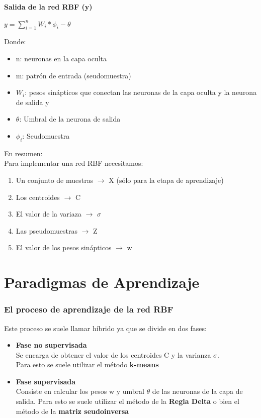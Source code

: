 \documentclass[
	11pt, %
]{beamer}
\begin{document}
\begin{frame}

  \textbf{Salida de la red RBF (y)}
  \bigskip %
  \begin{center}
    $y = \sum_{i=1} ^{n} W_{i} * \phi_{i} - \theta $
  \end{center}
  \bigskip %
  Donde:
  \begin{itemize}
  \item n: neuronas en la capa oculta
  \item m: patrón de entrada (seudomuestra)
  \item $W_{i}$: pesos sinápticos que conectan las neuronas de la capa oculta y la neurona de salida y
  \item $\theta$: Umbral de la neurona de salida
  \item $\phi_{i}$: Seudomuestra
  \end{itemize}
  
\end{frame}


\begin{frame}
  En resumen:\\
  Para implementar una red RBF necesitamos:
  \bigskip %
  \begin{enumerate}
  \item Un conjunto de muestras $\rightarrow$ X (sólo para la etapa de aprendizaje)
  \item Los centroides $\rightarrow$ C
  \item El valor de la variaza $\rightarrow$ $\sigma$
  \item Las pseudomuestras $\rightarrow$ Z
  \item El valor de los pesos sinápticos $\rightarrow$ w
  \end{enumerate}
\end{frame}

\section{Paradigmas de Aprendizaje}

\begin{frame}
  
  \frametitle{El proceso de aprendizaje de la red RBF}
  Este proceso se suele llamar híbrido ya que se divide en dos fases:\\
  \bigskip %
  \begin{itemize}
  \item \textbf{Fase no supervisada}\\
    Se encarga de obtener el valor de los centroides C y la varianza $\sigma$. \\
    Para esto se suele utilizar el método \textbf{k-means}
  \item \textbf{Fase supervisada}\\
    Consiste en calcular los pesos w y umbral $\theta$ de las neuronas de la capa de salida. Para esto se suele utilizar el método de la \textbf{Regla Delta} o bien el método de la \textbf{matriz seudoinversa}
  \end{itemize}
\end{frame}
\end{document}
